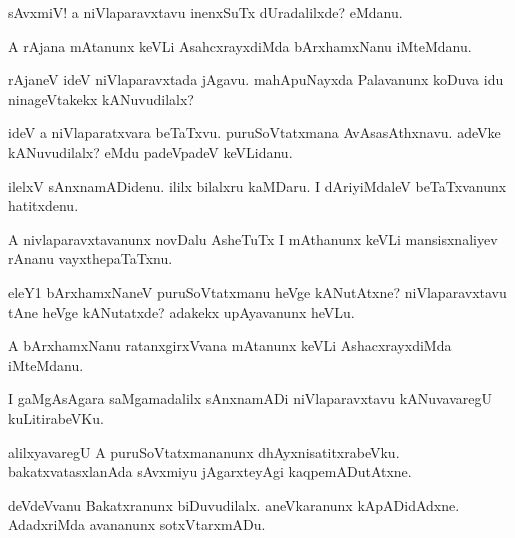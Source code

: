 \documentclass{article}
\begin{document}
\begin{mn}%
sAvxmiV! a niVlaparavxtavu inenxSuTx dUradalilxde? eMdanu.
\end{mn}

\begin{mn}%
A rAjana mAtanunx keVLi AsahcxrayxdiMda bArxhamxNanu iMteMdanu. 
\end{mn}

\begin{mn}%
rAjaneV ideV niVlaparavxtada jAgavu. mahApuNayxda Palavanunx koDuva idu ninageVtakekx 
kANuvudilalx?
\end{mn}

\begin{mn}%
ideV a niVlaparatxvara beTaTxvu. puruSoVtatxmana AvAsasAthxnavu. adeVke kANuvudilalx? eMdu 
padeVpadeV keVLidanu.
\end{mn}

\begin{mn}%
ilelxV sAnxnamADidenu. ililx bilalxru kaMDaru. I dAriyiMdaleV beTaTxvanunx hatitxdenu.
\end{mn}

\begin{mn}%
A nivlaparavxtavanunx novDalu AsheTuTx I mAthanunx keVLi mansisxnaliyev rAnanu 
vayxthepaTaTxnu.
\end{mn}

\begin{mn}%
eleY1 bArxhamxNaneV puruSoVtatxmanu heVge kANutAtxne? niVlaparavxtavu tAne heVge 
kANutatxde? adakekx upAyavanunx heVLu.
\end{mn}

\begin{mn}%
A bArxhamxNanu ratanxgirxVvana mAtanunx keVLi AshacxrayxdiMda iMteMdanu.
\end{mn}

\begin{mn}%
I gaMgAsAgara saMgamadalilx sAnxnamADi niVlaparavxtavu kANuvavaregU kuLitirabeVKu. 
\end{mn}

\begin{mn}%
alilxyavaregU A puruSoVtatxmananunx dhAyxnisatitxrabeVku. bakatxvatasxlanAda sAvxmiyu 
jAgarxteyAgi kaqpemADutAtxne.
\end{mn}

\begin{mn}%
deVdeVvanu Bakatxranunx biDuvudilalx. aneVkaranunx kApADidAdxne. AdadxriMda avananunx 
sotxVtarxmADu.
\end{mn}
\end{document}
